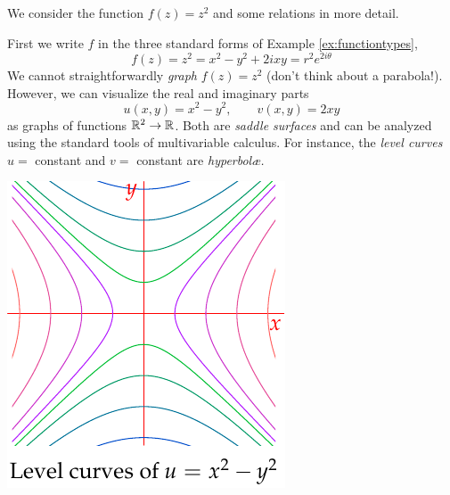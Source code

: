 \begin{examples}{}{}
We consider the function $f(z)=z^2$ and some relations in more detail.\par
\begin{minipage}[t]{0.65\linewidth}\vspace{0pt}
First we write $f$ in the three standard forms of Example \ref{ex:functiontypes},
\[f(z)=z^2=x^2-y^2+2ixy =r^2e^{2i\theta}\]
We cannot straightforwardly \emph{graph} $f(z)=z^2$ (don't think about a parabola!). However, we can visualize the real and imaginary parts
\[u(x,y)=x^2-y^2,\qquad v(x,y)=2xy\]
as graphs of functions $\mathbb{R}^2\to\mathbb{R}$. Both are \emph{saddle surfaces} and can be analyzed using the standard tools of multivariable calculus. For instance, the \emph{level curves} $u=$ constant and $v=$ constant are \emph{hyperbolæ.}
\end{minipage}\begin{minipage}[t]{0.34\linewidth}\vspace{0pt}
\flushright\includegraphics{functions-zsq}
\end{minipage}
\goodbreak


\end{examples}
